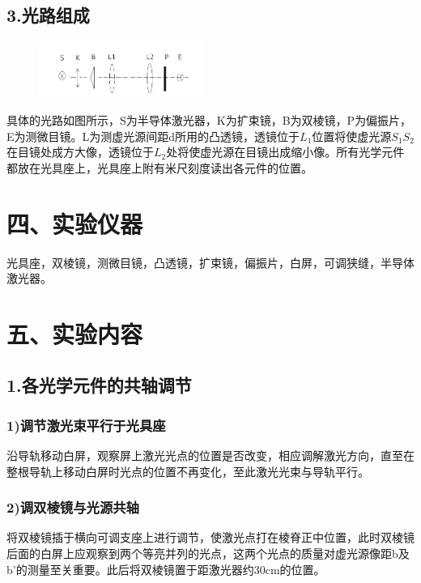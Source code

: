\documentclass[11pt,a4paper,oneside]{article}
\begin{document}
\subsection*{3.光路组成}
\begin{figure}
  \vspace{-20pt}
  \begin{center}
    \includegraphics[width=0.48\textwidth]{Instrument1071.png}
  \end{center}
  \vspace{-20pt}
  \vspace{-10pt}
\end{figure}
 具体的光路如图所示，S为半导体激光器，K为扩束镜，B为双棱镜，P为偏振片，E为测微目镜。L为测虚光源间距d所用的凸透镜，透镜位于${L_1}$位置将使虚光源${S_1}{S_2}$在目镜处成方大像，透镜位于${L_2}$处将使虚光源在目镜出成缩小像。所有光学元件都放在光具座上，光具座上附有米尺刻度读出各元件的位置。
 
\section*{四、实验仪器}
   光具座，双棱镜，测微目镜，凸透镜，扩束镜，偏振片，白屏，可调狭缝，半导体激光器。
   
\section*{五、实验内容}

\subsection*{1.各光学元件的共轴调节}
\subsubsection*{1)调节激光束平行于光具座}
沿导轨移动白屏，观察屏上激光光点的位置是否改变，相应调解激光方向，直至在整根导轨上移动白屏时光点的位置不再变化，至此激光光束与导轨平行。
\subsubsection*{2)调双棱镜与光源共轴}
将双棱镜插于横向可调支座上进行调节，使激光点打在棱脊正中位置，此时双棱镜后面的白屏上应观察到两个等亮并列的光点，这两个光点的质量对虚光源像距b及b’的测量至关重要。此后将双棱镜置于距激光器约30cm的位置。
\end{document}
